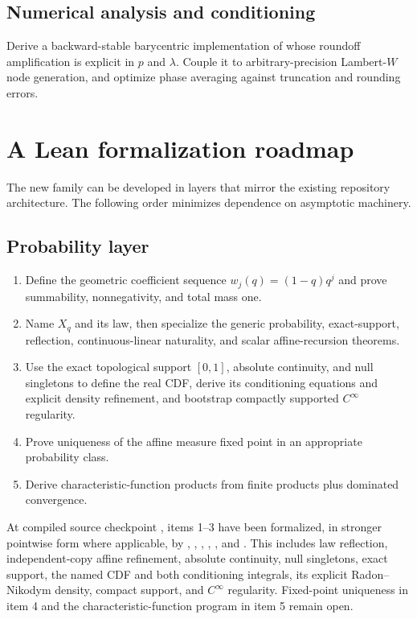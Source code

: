\documentclass[11pt]{article}
\numberwithin{equation}{section}
\theoremstyle{definition}
\theoremstyle{remark}
\begin{document}
\subsection{Numerical analysis and conditioning}

\begin{problem}
Derive a backward-stable barycentric implementation of  whose
roundoff amplification is explicit in $p$ and $\lambda$.  Couple it to arbitrary-precision
Lambert-$W$ node generation, and optimize phase averaging against truncation and rounding
errors.
\end{problem}

\section{A Lean formalization roadmap}
\label{p10:sec:lean}

The new family can be developed in layers that mirror the existing repository architecture.
The following order minimizes dependence on asymptotic machinery.

\subsection{Probability layer}

\begin{enumerate}
\item Define the geometric coefficient sequence $w_j(q)= (1-q)q^j$ and prove summability,
      nonnegativity, and total mass one.
\item Name \(X_q\) and its law, then specialize the generic probability, exact-support,
      reflection, continuous-linear naturality, and scalar affine-recursion theorems.
\item Use the exact topological support \([0,1]\), absolute continuity, and null singletons to
      define the real CDF, derive its conditioning equations and explicit density refinement,
      and bootstrap compactly supported \(C^\infty\) regularity.
\item Prove uniqueness of the affine measure fixed point in an appropriate probability class.
\item Derive characteristic-function products from finite products plus dominated convergence.
\end{enumerate}

At compiled source checkpoint , items 1--3 have been formalized, in
stronger pointwise form where applicable, by ,
, ,
, , and
.  This includes law reflection, independent-copy affine
refinement, absolute continuity, null singletons, exact support, the named CDF and both
conditioning integrals, its explicit Radon--Nikodym density, compact support, and
\(C^\infty\) regularity.  Fixed-point uniqueness in item 4 and the
characteristic-function program in item 5 remain open.
\end{document}
